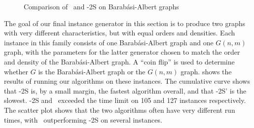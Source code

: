 \begin{figure}[htb]
    \centering
    \caption{Comparison of \McSplit\ and \McSplit-2S on Barabási-Albert graphs}
    \label{figure:mcsplit-vs-mcsplit2-ba}
\end{figure}

The goal of our final instance generator in this section is to produce two graphs with very different
characteristics, but with equal orders and densities.  Each instance in this family
consists of one Barabási-Albert graph and one $G(n,m)$ graph, with the parameters for the latter
generator chosen to match the order and density of the Barabási-Albert graph.  A ``coin flip''
is used to determine whether $G$ is the Barabási-Albert graph or the $G(n,m)$ graph.
shows the results of running our algorithms on these instances.  The cumulative curve shows that \McSplit-2S is, by a small margin, the
fastest algorithm overall, and that \McSplit-2S' is the slowest.  \McSplit-2S and \McSplit\ exceeded
the time limit on 105 and 127 instances respectively.  The scatter plot shows that the two
algorithms often have very different run times, with \McSplit\ outperforming \McSplit-2S on several instances.

